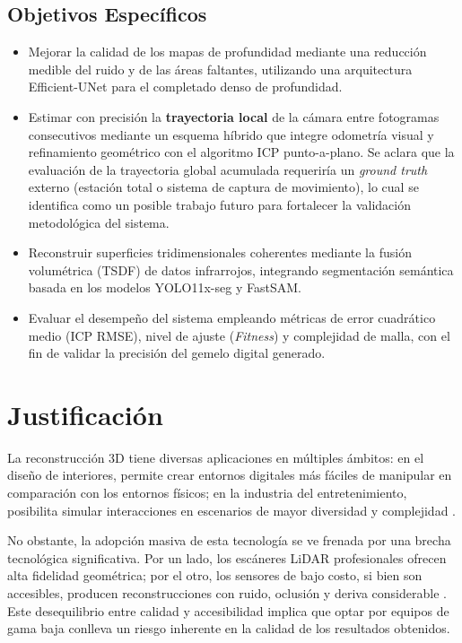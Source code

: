 \documentclass[12pt, a4, twoside, openany]{report}
\begin{document}
\subsection{Objetivos Específicos}

\begin{itemize}
    \item Mejorar la calidad de los mapas de profundidad mediante una reducción medible del ruido y de las áreas faltantes, utilizando una arquitectura Efficient-UNet para el completado denso de profundidad.
    \item Estimar con precisión la \textbf{trayectoria local} de la cámara entre fotogramas consecutivos mediante un esquema híbrido que integre odometría visual y refinamiento geométrico con el algoritmo ICP punto-a-plano. Se aclara que la evaluación de la trayectoria global acumulada requeriría un \textit{ground truth} externo (estación total o sistema de captura de movimiento), lo cual se identifica como un posible trabajo futuro para fortalecer la validación metodológica del sistema.
    \item Reconstruir superficies tridimensionales coherentes mediante la fusión volumétrica (TSDF) de datos infrarrojos, integrando segmentación semántica basada en los modelos YOLO11x-seg y FastSAM.
    \item Evaluar el desempeño del sistema empleando métricas de error cuadrático medio (ICP RMSE), nivel de ajuste (\textit{Fitness}) y complejidad de malla, con el fin de validar la precisión del gemelo digital generado.
\end{itemize}

\section{Justificación}

La reconstrucción 3D tiene diversas aplicaciones en múltiples ámbitos: en el diseño de interiores, permite crear entornos digitales más fáciles de manipular en comparación con los entornos físicos; en la industria del entretenimiento, posibilita simular interacciones en escenarios de mayor diversidad y complejidad \cite{app15126681}.

No obstante, la adopción masiva de esta tecnología se ve frenada por una brecha tecnológica significativa. Por un lado, los escáneres LiDAR profesionales ofrecen alta fidelidad geométrica; por el otro, los sensores de bajo costo, si bien son accesibles, producen reconstrucciones con ruido, oclusión y deriva considerable \cite{afzal2025improving,6594910}. Este desequilibrio entre calidad y accesibilidad implica que optar por equipos de gama baja conlleva un riesgo inherente en la calidad de los resultados obtenidos.
\end{document}
